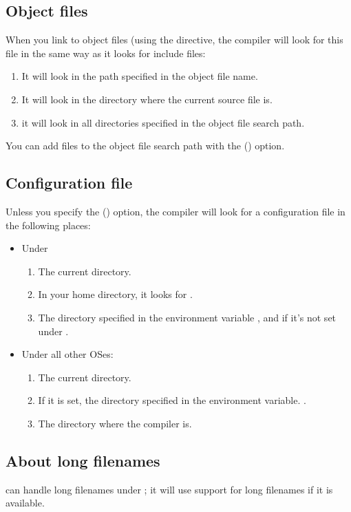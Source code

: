 \documentclass{book}
\begin{document}
\subsection{Object files}
When you link to object files (using the  directive,
the compiler will look for this file in the same way as it looks for include
files:

\begin{enumerate}
\item It will look in the path specified in the object file name.
\item It will look in the directory where the current source file is.
\item it will look in all directories specified in the object file search path.
\end{enumerate}
You can add files to the object file search path with the  ()
option.

\subsection{Configuration file}
\label{searchconfig}
Unless you specify the  () option, the compiler will look
for a configuration file  in the following places:

\begin{itemize}
\item Under \linux
\begin{enumerate}
\item The current directory.
\item In your home directory, it looks for .
\item The directory specified in the environment variable
, and if it's not set under .
\end{enumerate}
\item Under all other OSes:
\begin{enumerate}
\item The current directory.
\item If it is set, the directory specified in the environment variable.
.
\item The directory where the compiler is.
\end{enumerate}
\end{itemize}

\subsection{About long filenames}
\fpc can handle long filenames under \windows; it will use support for
long filenames if it is available.
\end{document}
